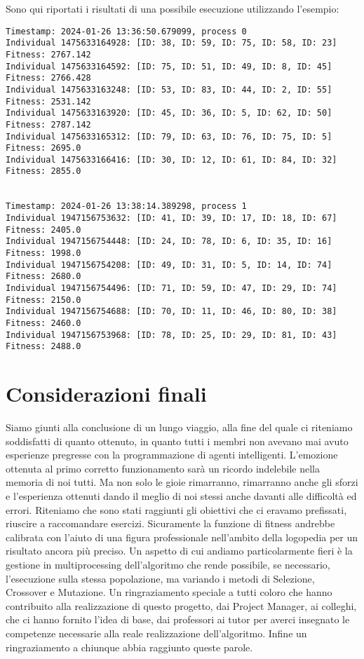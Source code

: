 \documentclass{article}
\begin{document}
\pagebreak
Sono qui riportati i risultati di una possibile esecuzione utilizzando l'esempio:
\begin{lstlisting}
Timestamp: 2024-01-26 13:36:50.679099, process 0
Individual 1475633164928: [ID: 38, ID: 59, ID: 75, ID: 58, ID: 23] Fitness: 2767.142
Individual 1475633164592: [ID: 75, ID: 51, ID: 49, ID: 8, ID: 45] Fitness: 2766.428
Individual 1475633163248: [ID: 53, ID: 83, ID: 44, ID: 2, ID: 55] Fitness: 2531.142
Individual 1475633163920: [ID: 45, ID: 36, ID: 5, ID: 62, ID: 50] Fitness: 2787.142
Individual 1475633165312: [ID: 79, ID: 63, ID: 76, ID: 75, ID: 5] Fitness: 2695.0
Individual 1475633166416: [ID: 30, ID: 12, ID: 61, ID: 84, ID: 32] Fitness: 2855.0


Timestamp: 2024-01-26 13:38:14.389298, process 1
Individual 1947156753632: [ID: 41, ID: 39, ID: 17, ID: 18, ID: 67] Fitness: 2405.0
Individual 1947156754448: [ID: 24, ID: 78, ID: 6, ID: 35, ID: 16] Fitness: 1998.0
Individual 1947156754208: [ID: 49, ID: 31, ID: 5, ID: 14, ID: 74] Fitness: 2680.0
Individual 1947156754496: [ID: 71, ID: 59, ID: 47, ID: 29, ID: 74] Fitness: 2150.0
Individual 1947156754688: [ID: 70, ID: 11, ID: 46, ID: 80, ID: 38] Fitness: 2460.0
Individual 1947156753968: [ID: 78, ID: 25, ID: 29, ID: 81, ID: 43] Fitness: 2488.0
\end{lstlisting}
\section{Considerazioni finali}
Siamo giunti alla conclusione di un lungo viaggio, alla fine del quale ci riteniamo soddisfatti di quanto ottenuto, in quanto tutti i membri non avevano mai avuto esperienze pregresse con la programmazione di agenti intelligenti. L'emozione ottenuta al primo corretto funzionamento sarà un ricordo indelebile nella memoria di noi tutti. Ma non solo le gioie rimarranno, rimarranno anche gli sforzi e l'esperienza ottenuti dando il meglio di noi stessi anche davanti alle difficoltà ed errori. Riteniamo che sono stati raggiunti gli obiettivi che ci eravamo prefissati, riuscire a raccomandare esercizi. Sicuramente la funzione di fitness andrebbe calibrata con l'aiuto di una figura professionale nell'ambito della logopedia per un risultato ancora più preciso. Un aspetto di cui andiamo particolarmente fieri è la gestione in multiprocessing dell'algoritmo che rende possibile, se necessario, l'esecuzione sulla stessa popolazione, ma variando i metodi di Selezione, Crossover e Mutazione. Un ringraziamento speciale a tutti coloro che hanno contribuito alla realizzazione di questo progetto, dai Project Manager, ai colleghi, che ci hanno fornito l'idea di base, dai professori ai tutor per averci insegnato le competenze necessarie alla reale realizzazione dell'algoritmo. Infine un ringraziamento a chiunque abbia raggiunto queste parole.
\end{document}
